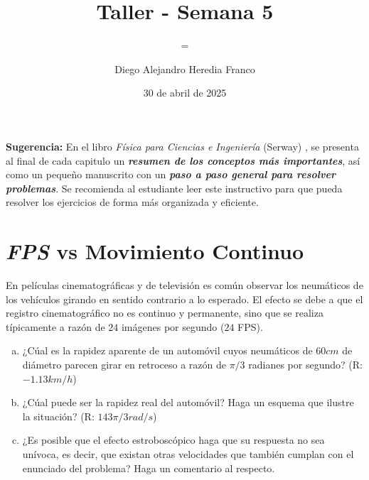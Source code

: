 \documentclass{replab}
\title{Taller - Semana 5}
\author{Diego Alejandro Heredia Franco}
\date{30 de abril de 2025}
\subtitle={Física - Geometría}
\begin{document}
\setlength{\parindent}{0pt}
	
	\pagestyle{fancy}
	\unspacedoperators
	
	{\begin{tcolorbox}[colframe=white, colback=principaldos, arc=8pt]
		\begin{center}
			\maketitle

		\end{center}
	\end{tcolorbox}}

{\begin{tcolorbox}[colframe=red!50!black, colback=red!5!white, arc=8pt]
	\textbf{Sugerencia:} En el libro \textit{Física para Ciencias e Ingeniería} (Serway) \cite{serway}, se presenta al final de cada capitulo un \textit{\textbf{resumen de los conceptos más importantes}}, así como un pequeño manuscrito con un \textit{\textbf{paso a paso general para resolver problemas}}. Se recomienda al estudiante leer este instructivo para que pueda resolver los ejercicios de forma más organizada y eficiente.
\end{tcolorbox}}

	\section{\textit{FPS} vs Movimiento Continuo}

	En películas cinematográficas y de televisión es común observar los neumáticos de los vehículos girando en sentido contrario a lo esperado. El efecto se debe a que el registro cinematográfico no es continuo y permanente, sino que se realiza típicamente a razón de $24$ imágenes por segundo ($24$ FPS).

	\begin{enumerate}[a)]
		\item ¿Cúal es la rapidez aparente de un automóvil cuyos neumáticos de $60cm$ de diámetro parecen girar en retroceso a razón de $\pi/3$ radianes por segundo? (R: $-1.13km/h$)
		\item ¿Cúal puede ser la rapidez real del automóvil? Haga un esquema que ilustre la situación? (R: $143\pi/3 rad/s$)
		\item ¿Es posible que el efecto estroboscópico haga que su respuesta no sea unívoca, es decir, que existan otras velocidades que también cumplan con el enunciado del problema? Haga un comentario al respecto.
	\end{enumerate}
\end{document}
